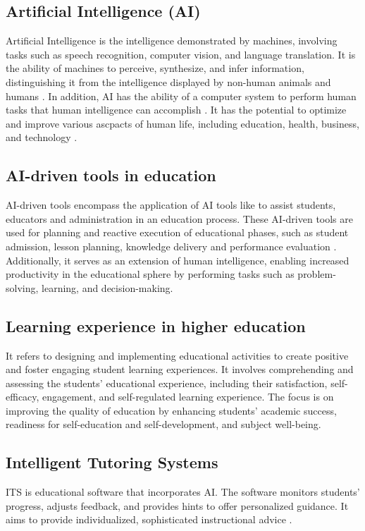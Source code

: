 \subsection{Artificial Intelligence (AI)}
Artificial Intelligence is the intelligence demonstrated by machines, 
involving tasks such as speech recognition, computer vision, 
and language translation.  It is the ability of machines to perceive, synthesize, and infer information, 
distinguishing it from the intelligence displayed by non-human animals and humans \citep{ola_artificial_2023}.
In addition, AI has the ability of  a computer system 
to perform human tasks that
human intelligence can accomplish \citep{sadiku_ai_2021}. 
It has the potential to optimize and improve various ascpacts
of human life, including education, health, business, 
and technology \citep{cheng_widespread_2023}.
\subsection{AI-driven tools in education}
AI-driven tools encompass the application of AI tools like  to assist students,
educators and administration in an education process. These AI-driven tools are used for
planning and reactive execution of educational phases, such as student admission, lesson planning,
knowledge delivery and performance evaluation \citep{mallik_proactive_2023}.
Additionally, it serves as an extension of human intelligence, enabling increased productivity in
the educational sphere by performing tasks such as problem-solving, learning, and decision-making\citep{cheng_widespread_2023}.
\subsection{Learning experience in higher education}
It refers to designing and implementing educational activities to create positive
and foster engaging student learning experiences\citep{kang_supporting_2023}.
It involves comprehending and assessing the students’ educational experience, including their satisfaction,
self-efficacy, engagement, and self-regulated learning experience\citep{lyz_students_2022}.
The focus is on improving the quality of education by enhancing students’ academic success,
readiness for self-education and self-development, and subject well-being\citep{iordache-platis_building_2018}.
\subsection{Intelligent Tutoring Systems}
ITS is educational software that incorporates AI. The software monitors students’ progress,
adjusts feedback, and provides hints to offer personalized guidance\citep{shute_intelligent_2010}. It aims to provide individualized, sophisticated instructional advice
\citep{sedlmeier_intelligent_2001}.
